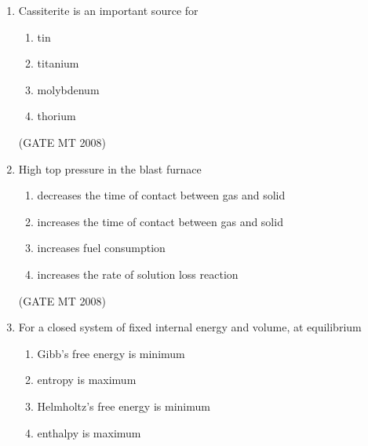 \documentclass[journal, 11pt, onecolumn]{IEEEtran}
\theoremstyle{remark}
\begin{document}
\begin{enumerate}
\begin{multicols}{4}
\begin{enumerate}
\item $0$
\item $1$
\item $3$ 
\item tends to $\infty$
\end{enumerate}
\end{multicols}


\hfill(GATE MT 2008)

\item Cassiterite is an important source for

\begin{multicols}{4}
\begin{enumerate}
\item tin
\item titanium 
\item molybdenum
\item thorium
\end{enumerate}
\end{multicols}

\hfill(GATE MT 2008)

\item High top pressure in the blast furnace

\begin{multicols}{1}
\begin{enumerate}
\item decreases the time of contact between gas and solid
\item increases the time of contact between gas and solid 
\item increases fuel consumption
\item increases the rate of solution loss reaction
\end{enumerate}
\end{multicols}

\hfill (GATE MT 2008)

\item For a closed system of fixed internal energy and volume, at equilibrium

\begin{multicols}{2}
\begin{enumerate}
\item Gibb's free energy is minimum
\item entropy is maximum
\item Helmholtz's free energy is minimum
\item enthalpy is maximum
\end{enumerate}
\end{multicols}


\end{enumerate}
\end{document}
